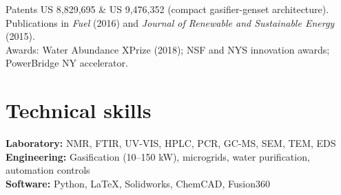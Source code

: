 \documentclass[10pt,letterpaper]{article}
\begin{document}
Patents US 8,829,695 \& US 9,476,352 (compact gasifier-genset architecture).\\
Publications in \textit{Fuel} (2016) and \textit{Journal of Renewable and Sustainable Energy} (2015).\\
Awards: Water Abundance XPrize (2018); NSF and NYS innovation awards; PowerBridge NY accelerator.

\section{Technical skills}

\textbf{Laboratory:} NMR, FTIR, UV-VIS, HPLC, PCR, GC-MS, SEM, TEM, EDS\\
\textbf{Engineering:} Gasification (10--150 kW), microgrids, water purification, automation controls\\
\textbf{Software:} Python, \LaTeX, Solidworks, ChemCAD, Fusion360
\end{document}
